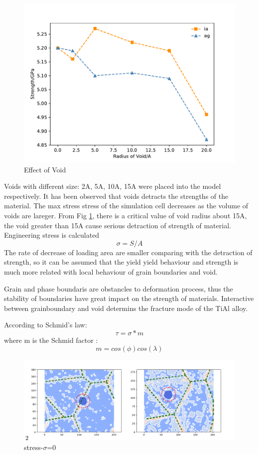 \documentclass[times]{elsarticle}
\begin{document}
\begin{figure}[h]
	\centering
 	\includegraphics[width=0.7\linewidth]{img/effect_of_vol}
	\caption{Effect of Void}
	\label{fig:voleff}
\end{figure}


Voids with different size: 2A, 5A, 10A, 15A were placed into the model respectively. It has been observed that  voids detracts the strengths of the material. The max stress stress of the simulation cell decreases as the volume of voids are lareger. From Fig \ref{fig:voleff}, there is a critical value of void radius about 15A, the void greater than 15A cause serious detraction of strength of material. 
Engineering stress is calculated
$$ \sigma = S/A$$
The rate of decrease of loading area are smaller comparing with the detraction of strength, so it can be assumed that the yield yield behaviour and strength is much more related with local behaviour of grain boundaries and void.

Grain and phase boundaris are obstancles to deformation process, thus the stability of boundaries have great impact on the strength of materials. Interactive between grainboundary and void determins the fracture mode of the TiAl alloy.

According to Schmid's law:
$$\tau = \sigma*m$$
where m is the Schmid factor :
$$ m = cos(\phi)cos(\lambda)$$
\begin{figure}[h]
	\centering
	\includegraphics[width=0.7\linewidth]{img/frame2}
	\caption{stress-$\sigma$=0}
	\label{ }
\end{figure}
\end{document}

